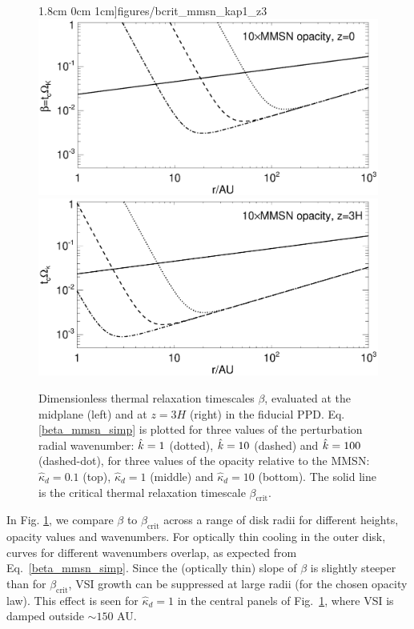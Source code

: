 \begin{figure}
  1.8cm 0cm 1cm]{figures/bcrit_mmsn_kap1_z3}\\
  \includegraphics[scale=.47,clip=true,trim=0cm 0cm 0cm
  1cm]{figures/bcrit_mmsn_kap10_z0}\includegraphics[scale=.47,clip=true,trim=2.5cm 0cm 0cm
  1cm]{figures/bcrit_mmsn_kap10_z3} 
  \caption{Dimensionless thermal relaxation timescales $\beta$,
    evaluated at the midplane (left) and at $z=3H$ (right) in the
    fiducial PPD. Eq. \ref{beta_mmsn_simp} is plotted  
    for three values of the 
    perturbation radial wavenumber: $\hat{k}=1$ (dotted), $\hat{k}=10$
    (dashed) and $\hat{k}=100$ (dashed-dot), for three values of the
    opacity relative to the MMSN: $\hat{\kappa}_d=0.1$ (top),
    $\hat{\kappa}_d=1$ (middle) and $\hat{\kappa}_d=10$ (bottom).  
    The solid line is the 
    critical thermal relaxation timescale $\beta_\mathrm{crit}$.  
    \label{mmsn_bcrit_bcool}}   
\end{figure}  

In Fig. \ref{mmsn_bcrit_bcool}, we compare $\beta$ to
$\beta_\mathrm{crit}$ across a range of disk radii for different
heights, opacity values and wavenumbers. 
For optically thin cooling in the outer disk, curves for different
wavenumbers overlap, as expected from Eq.\ \ref{beta_mmsn_simp}. 
Since the (optically thin) slope of $\beta$ is slightly steeper than
for $\beta_\mathrm{crit}$, VSI growth can be suppressed at large radii
(for the chosen opacity law).  This effect is seen for $\hat{\kappa}_d
= 1$ in the central panels of Fig.\ \ref{mmsn_bcrit_bcool}, where VSI
is damped outside $\sim 150$ AU. 

